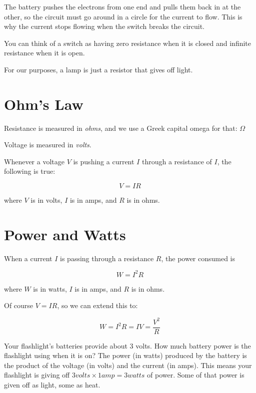 The battery pushes the electrons from one end and pulls them back in at the other, so the circuit must go around in a circle for the current to flow. This is why the current stops flowing when the switch breaks the circuit.

You can think of a switch as having zero resistance when it is closed and infinite resistance when it is open.


For our purposes, a lamp is just a resistor that gives off light.

\section{Ohm's Law}

Resistance is measured in \textit{ohms}, and we use a Greek capital omega for that: $\Omega$  

Voltage is measured in
\textit{volts}.

\begin{mdframed}[style=important, frametitle={Ohm's Law}]
  Whenever a voltage $V$ is pushing a current $I$ through a resistance of $I$, the following is true:

  $$V = IR$$

  where $V$ is in volts, $I$ is in amps, and $R$ is in ohms.
\end{mdframed}

\section{Power and Watts}

\begin{mdframed}[style=important, frametitle={Joule's Law}]

  When a current $I$ is passing through a resistance $R$, the power consumed is
  
  $$W = I^2 R$$

  where $W$ is in watts, $I$ is in amps, and $R$ is in ohms.
\end{mdframed}

Of course $V = IR$, so we can extend this to:

$$W = I^2 R = I V = \frac{V^2}{R}$$

Your flashlight's batteries provide about 3 volts. How much
battery power is the flashlight using when it is on? The power (in
watts) produced by the battery is the product of the voltage (in
volts) and the current (in amps). This means your flashlight is giving off $3
volts \times 1 amp = 3 watts$ of power. Some of that power is given
off as light, some as heat.

